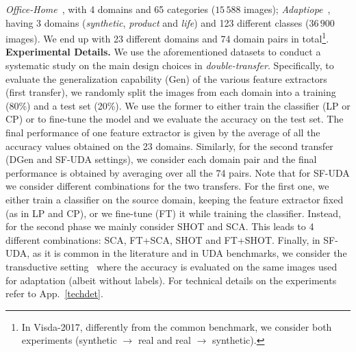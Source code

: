 \documentclass{article}
\begin{document}
 \textit{Office-Home}~\citep{venkateswara2017deep}, with 4 domains and 65 categories ($15\,588$ images);
 \textit{Adaptiope}~\citep{ringwald2021adaptiope}, having 3 domains (\textit{synthetic}, \textit{product} and \textit{life}) and 123 different classes ($36\,900$ images).
 We end up with 23 different domains and 74 domain pairs in total\footnote{In Visda-2017, differently from the common benchmark, we consider both experiments (synthetic $\to$ real and real $\to$ synthetic).}.\\
\textbf{Experimental Details.} 
We use the aforementioned datasets to conduct a systematic study on the main design choices in  \textit{double-transfer}. Specifically, to evaluate the generalization capability (Gen) of the various feature extractors (first transfer), we randomly split the images from each domain into a training (80\%) and a test set (20\%). 
We use the former to either train the classifier (LP or CP) or to fine-tune the model and we evaluate the accuracy on the test set. The final performance of one feature extractor is given by the average of all the accuracy values obtained on the 23 domains.
Similarly, for the second transfer (DGen and SF-UDA settings), we consider each domain pair and the final performance is obtained by averaging over all the 74 pairs.
Note that for SF-UDA we consider different combinations for the two transfers. 
For the first one, we either train a classifier on the source domain, keeping the feature extractor fixed (as in LP and CP), or we fine-tune (FT) it while training the classifier.
Instead, for the second phase we mainly consider SHOT and SCA. 
This leads to 4 different combinations: SCA, FT+SCA, SHOT and FT+SHOT. 
Finally, in SF-UDA, as it is common in the literature and in UDA benchmarks, we consider the transductive setting~\citep{kouw2019review} where the accuracy is evaluated on the same images used for  adaptation (albeit without labels). 
For technical details on the experiments refer to App.~\ref{techdet}.
\end{document}
